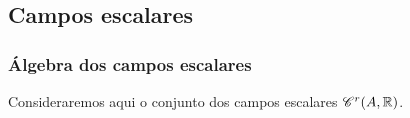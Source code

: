 \begin{comment}
Finalmente, como $\langle \cdot, \cdot \rangle$ é bilinear, é $\Cont^\infty$-diferenciável, portanto se $\phi$ é $\Cont^r$-diferenciável e $v$ é $\Cont^{r'}$-diferenciável, a função $(\phi,v)$ é tão diferenciável quanto o mínimo entre $r$ e $s$, e então a composição $\langle \cdot, \cdot \rangle \circ (\phi,v)$ é $\Cont^{r \opmin s}$-diferenciável.
\end{proof}

Analogamente, obtemos o seguinte resultado.

\begin{proposition}
\label{prop:diferenciabilidade.contracao.tensorial2}
Sejam $\bm E$ um espaço normado, $A \subseteq E$ um aberto, $\fun{\phi}{A}{\toplin(E,E)}$ um campo $(1,1)$-tensorial diferenciável e $\fun{v}{A}{E}$ um campo vetorial diferenciável. O campo vetorial
	\begin{align*}
	\func{\phi(v)}{A}{E}{x}{\phi(v)(x) := \phi(x)(v(x))}
	\end{align*}
é diferenciável e, para todo $u \in E$,
	\begin{equation*}
	\D \phi(v)|_x(u) = \D \phi|_x(u)(v(x)) + \phi(x) (\D v|_x(u)).
	\end{equation*}
Se $\phi$ é $\Cont^r$-diferenciável e $v$ é $\Cont^{r'}$-diferenciável, então $\langle \phi, v \rangle$ é $\Cont^{r \opmin s}$-diferenciável.
\end{proposition}

\end{comment}






\subsection{Campos escalares}

\subsubsection{Álgebra dos campos escalares}

Consideraremos aqui o conjunto dos campos escalares $\mathscr{C}^r(A,\mathbb{R})$.


















